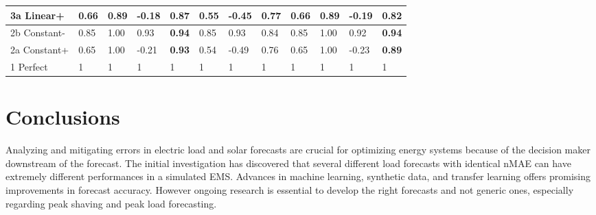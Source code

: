 \documentclass[conference]{IEEEtran}
\begin{document}
\begin{table}
\begin{tabular}{l|l l l l|l l l| l l l l}
        3a Linear+   & 0.66     & 0.89     & -0.18    & 0.87          & 0.55     & -0.45    & 0.77          & 0.66     & 0.89     & -0.19    & 0.82     \\ \hline
        2b Constant- & 0.85     & 1.00     & 0.93     & \textbf{0.94} & 0.85     & 0.93     & 0.84          & 0.85     & 1.00     & 0.92     & \textbf{0.94}     \\ \hline
        2a Constant+ & 0.65     & 1.00     & -0.21    & \textbf{0.93} & 0.54     & -0.49    & 0.76          & 0.65     & 1.00     & -0.23    & \textbf{0.89}     \\ \hline
        1 Perfect    & 1        & 1        & 1        & 1             & 1        & 1        & 1             & 1        & 1        & 1        & 1        \\ \hline
    \end{tabular}
\end{table}






\section{Conclusions}

Analyzing and mitigating errors in electric load and solar forecasts are crucial for optimizing energy systems because of the decision maker downstream of the forecast. The initial investigation has discovered that several different load forecasts with identical nMAE can have extremely different performances in a simulated EMS. Advances in machine learning, synthetic data, and transfer learning offers promising improvements in forecast accuracy. However ongoing research is essential to develop the right forecasts and not generic ones, especially regarding peak shaving and peak load forecasting.
\end{document}

